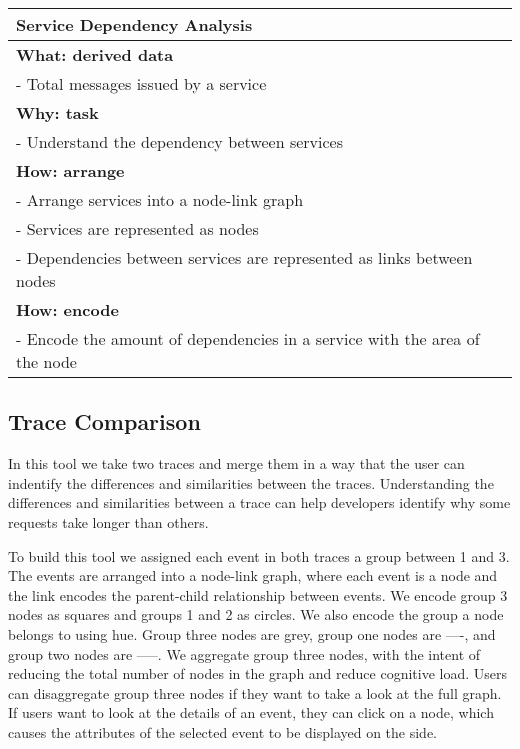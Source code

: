 \begin{center}
    \begin{tabular}{|p{}|}
        \hline
        \textbf{Service Dependency Analysis}                                   \\
        \hline
        \textbf{What: derived data}                                            \\
        - Total messages issued by a service                                   \\
        \hline
        \textbf{Why: task}                                                     \\
        - Understand the dependency between services                           \\
        \hline
        \textbf{How: arrange}                                                  \\
        - Arrange services into a node-link graph                              \\
        - Services are represented as nodes                                    \\
        - Dependencies between services are represented as links between nodes \\
        \textbf{How: encode}                                                   \\
        - Encode the amount of dependencies in a service with the area
        of the node                                                            \\
        \hline
    \end{tabular}
\end{center}


\subsection{Trace Comparison}

In this tool we take two traces and merge them in a way that the user can indentify the
differences and similarities between the traces. Understanding the differences and similarities
between a trace can help developers identify why some requests take longer than others.

To build this tool we assigned each event in both traces a group between 1 and 3. The events are arranged into a node-link graph,
where each event is a node and the link encodes the parent-child relationship between events. We encode group 3 nodes as squares and groups 1 and 2 as circles.
We also encode the group a node belongs to using hue. Group three nodes are grey, group one nodes are ----, and group two nodes are -----. We aggregate
group three nodes, with the intent of reducing the total number of nodes in the graph and reduce cognitive load. Users can disaggregate group three nodes if they
want to take a look at the full graph. If users want to look at the details of an event, they can click on a node, which causes the attributes of the selected event
to be displayed on the side.

